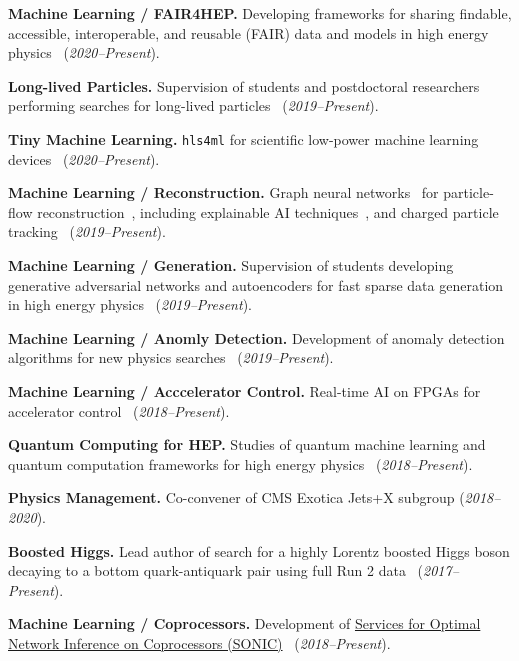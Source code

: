 \documentclass{res}
\begin{document}
\begin{resume}
  \textbf{Machine Learning / FAIR4HEP.} Developing frameworks for sharing findable, accessible, interoperable, and reusable (FAIR) data and models in high energy physics~\cite{Chen:2021euv} (\textit{2020--Present}).

  \textbf{Long-lived Particles.} Supervision of students and postdoctoral researchers performing searches for long-lived particles~\cite{CMS:2021yhb,CMS:2021juv} (\textit{2019--Present}).

  \textbf{Tiny Machine Learning.} \texttt{hls4ml} for scientific low-power machine learning devices~\cite{Banbury:2021mlperf,DiGuglielmo:2021ide,Hawks:2021ruw,Fahim:2021cic} (\textit{2020--Present}).

  \textbf{Machine Learning / Reconstruction.} Graph neural networks~\cite{Duarte:2020ngm} for particle-flow reconstruction~\cite{Pata:2022wam,CMS-DP-2021-030,Pata:2021oez}, including explainable AI techniques~\cite{Mokhtar:2021bkf}, and charged particle tracking~\cite{Elabd:2021lgo,Dezoort:2021kfk,Heintz:2020soy} (\textit{2019--Present}).

  \textbf{Machine Learning / Generation.} Supervision of students developing generative adversarial networks and autoencoders for fast sparse data generation in high energy physics~\cite{Touranakou:2022qrp,Kansal:2021cqp,Orzari:2021suh,Kansal:2020svm} (\textit{2019--Present}).

  \textbf{Machine Learning / Anomly Detection.} Development of anomaly detection algorithms for new physics searches~\cite{Aarrestad:2021oeb,Jawahar:2021vyu,Tsan:2021brw,Govorkova:2021utb,Kasieczka:2021xcg,Wozniak:2020} (\textit{2019--Present}).

  \textbf{Machine Learning / Acccelerator Control.} Real-time AI on FPGAs for accelerator control~\cite{John:2020sak} (\textit{2018--Present}).

  \textbf{Quantum Computing for HEP.} Studies of quantum machine learning and quantum computation frameworks for high energy physics~\cite{Zlokapa:2019tkn} (\textit{2018--Present}).

  \textbf{Physics Management.} Co-convener of CMS Exotica Jets+X subgroup (\textit{2018--2020}).

  \textbf{Boosted Higgs.} Lead author of search for a highly Lorentz boosted Higgs boson
  decaying to a bottom quark-antiquark pair using full Run 2 data~\cite{Sirunyan:2020hwz} (\textit{2017--Present}).

  \textbf{Machine Learning / Coprocessors.} Development of \href{https://github.com/fastmachinelearning/SonicCMS}{Services for Optimal Network Inference on Coprocessors (SONIC)}~\cite{Krupa:2020bwg,Rankin:2020usv,neurips2019_sonic,Duarte:2019fta} (\textit{2018--Present}).


\end{resume}
\end{document}

